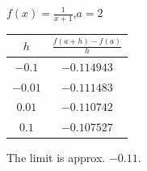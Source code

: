 {$\displaystyle f(x) = \frac{1}{x+1}$,\quad  $a=2$}
{\begin{tabular}{cc}
$h$ & $\frac{f(a+h)-f(a)}{h}$\\ \hline
 $-0.1$ & $-0.114943$ \\
 $-0.01$ & $-0.111483$ \\
 $0.01$ & $-0.110742$ \\
 $0.1$ & $-0.107527$
\end{tabular}

The limit is approx. $-0.11$.
}
